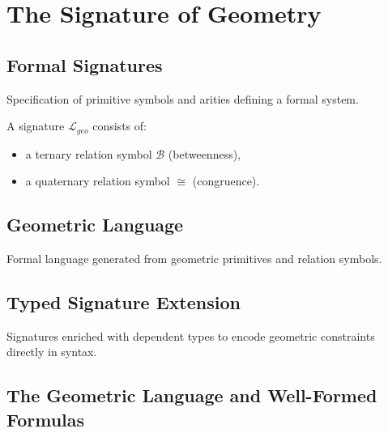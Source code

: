 \documentclass[../../../main/main.tex]{subfiles}
\begin{document}
\chapter{The Signature of Geometry}

\section{Formal Signatures}
Specification of primitive symbols and arities defining a formal system.
\begin{definition}
A signature $\mathcal{L}_{geo}$ consists of:
\begin{itemize}
    \item a ternary relation symbol $\mathcal{B}$ (betweenness),
    \item a quaternary relation symbol $\cong$ (congruence).
\end{itemize}
\end{definition}

\section{Geometric Language}
Formal language generated from geometric primitives and relation symbols.

\section{Typed Signature Extension}
Signatures enriched with dependent types to encode geometric constraints directly in syntax.

\section{The Geometric Language and Well-Formed Formulas}
\end{document}
